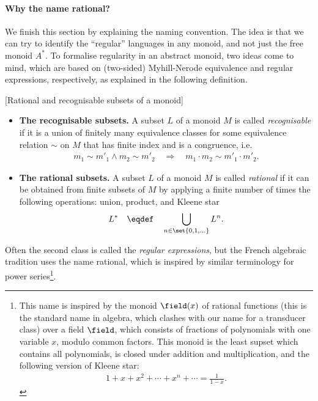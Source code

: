 \paragraph*{Why the name rational?} We finish this section by explaining the naming convention. The idea is that we can try to identify the ``regular'' languages in any monoid, and not just the free monoid $A^*$. To formalise regularity in an abstract monoid, two ideas come to mind, which are based on (two-sided) Myhill-Nerode equivalence and regular expressions, respectively, as explained in the following definition.
\begin{definition}\label{def:rational-recognisable-subsets}
    [Rational and recognisable subsets of a monoid] \ 
    \begin{itemize}
    \item \textbf{The recognisable subsets.} A subset $L$ of a monoid $M$  is called \emph{recognisable} if it is a union of finitely many equivalence classes for some equivalence relation $\sim$ on $M$ that has finite index and is a congruence, i.e.
    \begin{align*}
    m_1 \sim m'_1 \land m_2 \sim m'_2 \quad \Rightarrow \quad m_1 \cdot m_2 \sim m'_1 \cdot m'_2.
    \end{align*}
    \item \textbf{The rational subsets.} A subset $L$ of a monoid $M$ is called \emph{rational} if it can be obtained from finite subsets of $M$ by applying a finite number of times the following operations: union, product, and Kleene star
    \begin{align*}
    L^* \quad \eqdef \quad \bigcup_{n \in \set{0,1,\ldots}}L^n.
    \end{align*}
    \end{itemize}
\end{definition}
Often the second class is called the \emph{regular expressions}, but the French algebraic tradition uses the name rational, which is inspired by similar terminology for power series\footnote{
        This name is inspired by the monoid  $\field(x)$ of rational functions (this is the standard name in algebra, which clashes with our name for a transducer class) over a field $\field$, which consists of fractions of polynomials with one variable $x$, modulo common factors. This monoid is the least supset which contains all polynomials, is closed under addition and multiplication, and the following version of Kleene star:
        \begin{align*}
        1 + x + x^2 + \cdots + x^n + \cdots = \frac{1}{1-x}.
        \end{align*}
}.

